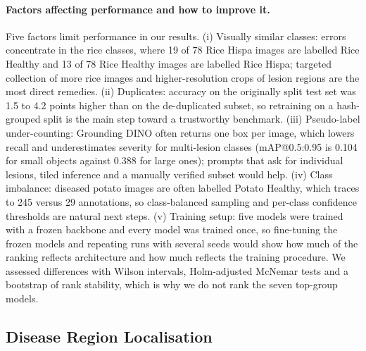\paragraph{Factors affecting performance and how to improve it.} Five factors limit performance in our results. (i) Visually similar classes: errors concentrate in the rice classes, where 19 of 78 Rice Hispa images are labelled Rice Healthy and 13 of 78 Rice Healthy images are labelled Rice Hispa; targeted collection of more rice images and higher-resolution crops of lesion regions are the most direct remedies. (ii) Duplicates: accuracy on the originally split test set was 1.5 to 4.2 points higher than on the de-duplicated subset, so retraining on a hash-grouped split is the main step toward a trustworthy benchmark. (iii) Pseudo-label under-counting: Grounding DINO often returns one box per image, which lowers recall and underestimates severity for multi-lesion classes (mAP@0.5:0.95 is 0.104 for small objects against 0.388 for large ones); prompts that ask for individual lesions, tiled inference and a manually verified subset would help. (iv) Class imbalance: diseased potato images are often labelled Potato Healthy, which traces to 245 versus 29 annotations, so class-balanced sampling and per-class confidence thresholds are natural next steps. (v) Training setup: five models were trained with a frozen backbone and every model was trained once, so fine-tuning the frozen models and repeating runs with several seeds would show how much of the ranking reflects architecture and how much reflects the training procedure. We assessed differences with Wilson intervals, Holm-adjusted McNemar tests and a bootstrap of rank stability, which is why we do not rank the seven top-group models.

\subsection{Disease Region Localisation}

